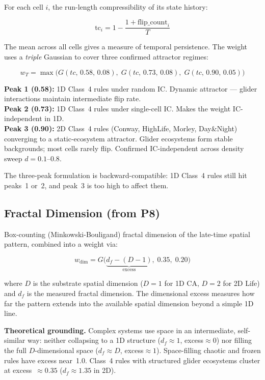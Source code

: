 \documentclass[12pt,a4paper]{article}
\begin{document}
For each cell $i$, the run-length compressibility of its state history:

\begin{equation}
\text{tc}_i = 1 - \frac{1 + \text{flip\_count}_i}{T}
\label{eq:tc}
\end{equation}

The mean across all cells gives a measure of temporal persistence.
The weight uses a \emph{triple} Gaussian to cover three confirmed
attractor regimes:

\begin{equation}
w_T = \max\!\bigl(G(tc,\,0.58,\,0.08),\;
                   G(tc,\,0.73,\,0.08),\;
                   G(tc,\,0.90,\,0.05)\bigr)
\label{eq:wT}
\end{equation}

\noindent\textbf{Peak 1 (0.58):} 1D Class~4 rules under random IC.
Dynamic attractor --- glider interactions maintain intermediate flip
rate.\\
\textbf{Peak 2 (0.73):} 1D Class~4 rules under single-cell IC.
Makes the weight IC-independent in 1D.\\
\textbf{Peak 3 (0.90):} 2D Class~4 rules (Conway, HighLife, Morley,
Day\&Night) converging to a static-ecosystem attractor.
Glider ecosystems form stable backgrounds; most cells rarely flip.
Confirmed IC-independent across density sweep $d=0.1$--$0.8$.

The three-peak formulation is backward-compatible: 1D Class~4 rules
still hit peaks~1 or~2, and peak~3 is too high to affect them.

\subsection{Fractal Dimension (from P8)}

Box-counting (Minkowski-Bouligand) fractal dimension of the
late-time spatial pattern, combined into a weight via:

\begin{equation}
w_\text{dim} = G\bigl(\underbrace{d_f - (D-1)}_{\text{excess}},\;0.35,\;0.20\bigr)
\label{eq:wdim}
\end{equation}

where $D$ is the substrate spatial dimension ($D=1$ for 1D CA,
$D=2$ for 2D Life) and $d_f$ is the measured fractal dimension.
The dimensional excess measures how far the pattern extends into the
available spatial dimension beyond a simple 1D line.

\textbf{Theoretical grounding.}
Complex systems use space in an intermediate, self-similar way:
neither collapsing to a 1D structure ($d_f\approx1$, excess$\approx0$)
nor filling the full $D$-dimensional space
($d_f\approx D$, excess$\approx1$).
Space-filling chaotic and frozen rules have excess near~1.0.
Class~4 rules with structured glider ecosystems cluster at
excess~$\approx0.35$ ($d_f\approx1.35$ in 2D).
\end{document}
